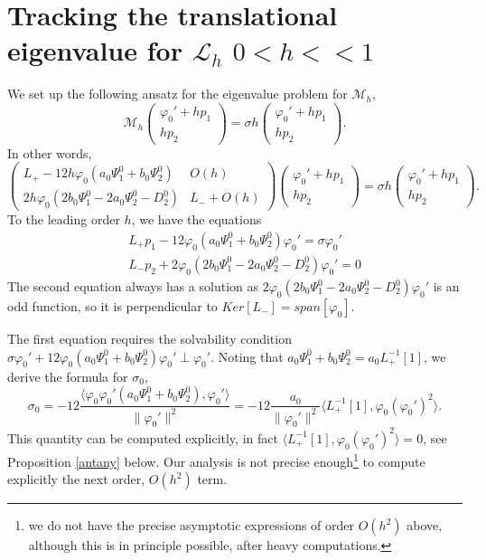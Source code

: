 \documentclass[12pt]{amsart}
\theoremstyle{definition}
\theoremstyle{remark}
\numberwithin{equation}{section}
\renewcommand{\(}{\left(}
\renewcommand{\)}{\right)}
\renewcommand{\[}{\left[}
\renewcommand{\]}{\right]}
\newcommand{\f}[2]{\frac{#1}{#2}}
\newcommand{\cl}{{\mathcal L}}
\newcommand{\si}{\sigma}
\newcommand{\vp}{\varphi}
\newcommand{\dpr}[2]{\langle #1,#2 \rangle}
\newcommand{\cm}{\mathcal M}
\begin{document}
   \section{Tracking the translational eigenvalue for  $\cl_h$ $0<h<<1$}
We set up the following ansatz for the eigenvalue problem for $\cm_h$,
   \begin{equation}
   \label{b:30}
   \cm_h  \left(\begin{array}{c}
   \vp_0'+h p_1  \\ h p_2
   \end{array}\right)=\si h  \left(\begin{array}{c}
   \vp_0'+h p_1  \\ h p_2
   \end{array}\right).
   \end{equation}
   In other words,
   \begin{equation}
   \label{b:40}
   \left(\begin{array}{cc}
   L_+ - 12 h \vp_0 (a_0 \Psi_1^0+b_0 \Psi_2^0) & O(h)  \\
   2h \vp_0(2 b_0\Psi_1^0-2 a_0 \Psi_2^0-D_2^0)& L_-+O(h)
   \end{array}\right)   \left(\begin{array}{c}
   \vp_0'+h p_1  \\ h p_2
   \end{array}\right)=\si h  \left(\begin{array}{c}
   \vp_0'  +h p_1  \\ h p_2
   \end{array}\right).
   \end{equation}
   To the leading order $h$, we have the equations
   \begin{eqnarray*}
   	& & 	L_+ p_1 - 12 \vp_0 (a_0 \Psi_1^0+b_0 \Psi_2^0) \vp_0'=\si \vp_0' \\
   	& & L_- p_2 + 2 \vp_0(2 b_0\Psi_1^0 - 2 a_0 \Psi_2^0-D_2^0) \vp_0'=0
   \end{eqnarray*}
   The second equation  always has a solution as $2 \vp_0(2 b_0\Psi_1^0 - 2 a_0 \Psi_2^0-D_2^0) \vp_0'$ is an odd function, so it is perpendicular to $Ker[L_-]=span[\vp_0]$.

   The first equation requires  the solvability condition $\si \vp_0' + 12 \vp_0 (a_0 \Psi_1^0+b_0 \Psi_2^0) \vp_0'\perp \vp_0'$. Noting that $a_0 \Psi_1^0+b_0 \Psi_2^0=a_0 L_+^{-1}[1]$,   we derive the formula for $\si_0$,
   \begin{equation}
   \label{b:50}
   \si_0=-12 \f{\dpr{\vp_0 \vp_0'(a_0 \Psi_1^0+b_0 \Psi_2^0)}{\vp_0'}}{\|\vp_0'\|^2}=
   -12 \f{a_0}{\|\vp_0'\|^2} \dpr{ L_{+}^{-1}[1]}{\vp_0 (\vp_0')^2}.
   \end{equation}
   This quantity can be computed explicitly, in fact  $\dpr{ L_{+}^{-1}[1]}{\vp_0 (\vp_0')^2}=0$, see Proposition \ref{antany} below. Our analysis is not precise enough\footnote{we do not have the precise asymptotic expressions of order  $O(h^2)$ above, although this is in principle  possible, after heavy computations.} to compute explicitly the next order, $O(h^2)$ term.
\end{document}

